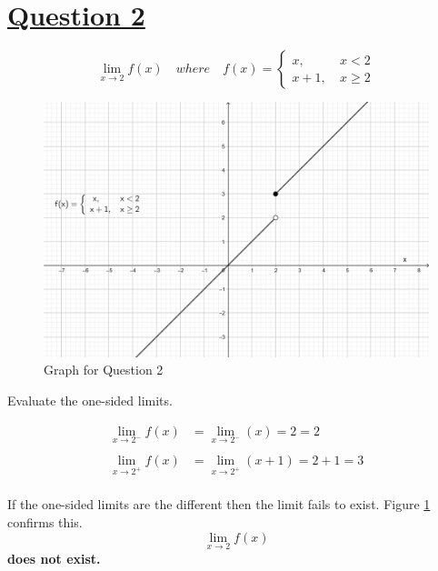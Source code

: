 \documentclass[16pt]{article}
\begin{document}
\vspace{2cm}

\section*{\underline{Question 2}}
\begin{huge}
	\[ \lim_{x \to 2}f(x) \quad where \quad f(x) = \begin{cases} 
		x, \ &x < 2 \\
		x + 1, \ &x \geq 2 
	\end{cases}
	\]
\end{huge}

\begin{figure}[h]
	\includegraphics[width=\textwidth]{graph2.jpg}
	\caption{Graph for Question 2}
	\label{graph2}
\end{figure}

\vspace{1cm}

\huge{Evaluate the one-sided limits.}

\begin{align*}
	\lim_{x\to2^-} f(x) & = \lim_{x\to2^-} (x) = 2 = 2 \\
	&
	\\
	\lim_{x\to2^+} f(x) & =  \lim_{x\to2^+} (x+1) = 2 + 1 = 3
\end{align*}
\\
If the one-sided limits are the different then the limit fails to exist. Figure \ref{graph2} confirms this. \\
\[ \displaystyle\lim_{x \to 2} f(x) \] \textbf{does not exist.}

\vspace{2cm}
\end{document}
